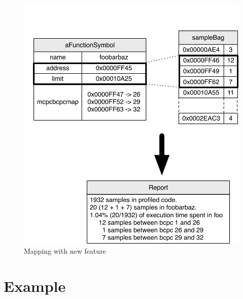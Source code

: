\documentclass[10pt,preprint,nonatbib]{sigplanconf}
\begin{document}
 \begin{figure}[!htp]
     \begin{center}
         \includegraphics[width=1.0\linewidth]{NewMapping}
         \caption{Mapping with new feature}
         \label{fig:NewMapping}
     \end{center}
 \end{figure}
 

\section{Example}
\end{document}

